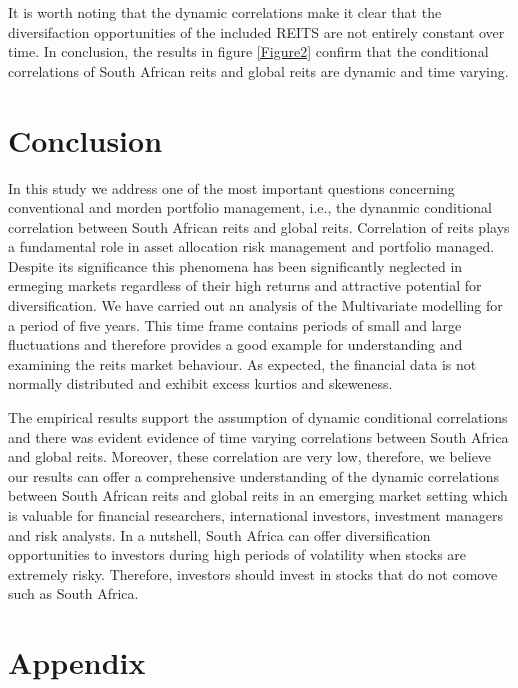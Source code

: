 \documentclass[11pt,preprint, authoryear]{elsarticle}
\numberwithin{equation}{section}
\numberwithin{figure}{section}
\numberwithin{table}{section}
\begin{document}
It is worth noting that the dynamic correlations make it clear that the
diversifaction opportunities of the included REITS are not entirely
constant over time. In conclusion, the results in figure \ref{Figure2}
confirm that the conditional correlations of South African reits and
global reits are dynamic and time varying.

\hypertarget{conclusion}{%
\section{\texorpdfstring{Conclusion
\label{conclusion}}{Conclusion }}\label{conclusion}}

In this study we address one of the most important questions concerning
conventional and morden portfolio management, i.e., the dynanmic
conditional correlation between South African reits and global reits.
Correlation of reits plays a fundamental role in asset allocation risk
management and portfolio managed. Despite its significance this
phenomena has been significantly neglected in ermeging markets
regardless of their high returns and attractive potential for
diversification. We have carried out an analysis of the Multivariate
modelling for a period of five years. This time frame contains periods
of small and large fluctuations and therefore provides a good example
for understanding and examining the reits market behaviour. As expected,
the financial data is not normally distributed and exhibit excess
kurtios and skeweness.

The empirical results support the assumption of dynamic conditional
correlations and there was evident evidence of time varying correlations
between South Africa and global reits. Moreover, these correlation are
very low, therefore, we believe our results can offer a comprehensive
understanding of the dynamic correlations between South African reits
and global reits in an emerging market setting which is valuable for
financial researchers, international investors, investment managers and
risk analysts. In a nutshell, South Africa can offer diversification
opportunities to investors during high periods of volatility when stocks
are extremely risky. Therefore, investors should invest in stocks that
do not comove such as South Africa.

\hypertarget{appendix}{%
\section{Appendix}\label{appendix}}
\end{document}
